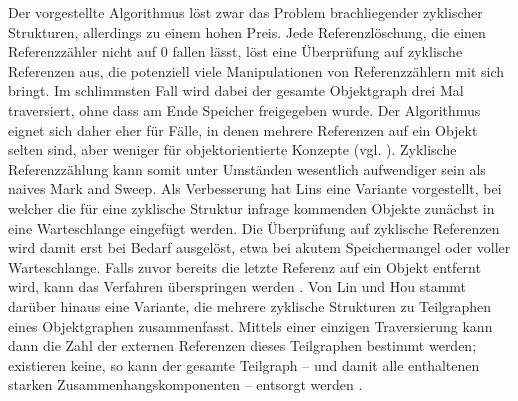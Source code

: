 Der vorgestellte Algorithmus löst zwar das Problem brachliegender zyklischer Strukturen, allerdings zu einem hohen Preis.
Jede Referenzlöschung, die einen Referenzzähler nicht auf $0$ fallen lässt, löst eine Überprüfung auf zyklische Referenzen aus, die potenziell viele Manipulationen von Referenzzählern mit sich bringt.
Im schlimmsten Fall wird dabei der gesamte Objektgraph drei Mal traversiert, ohne dass am Ende Speicher freigegeben wurde.
Der Algorithmus eignet sich daher eher für Fälle, in denen mehrere Referenzen auf ein Objekt selten sind, aber weniger für objektorientierte Konzepte (vgl. \cite[S. 215]{lins1992}).
Zyklische Referenzzählung kann somit unter Umständen wesentlich aufwendiger sein als naives Mark and Sweep.
Als Verbesserung hat Lins eine Variante vorgestellt, bei welcher die für eine zyklische Struktur infrage kommenden Objekte zunächst in eine Warteschlange eingefügt werden.
Die Überprüfung auf zyklische Referenzen wird damit erst bei Bedarf ausgelöst, etwa bei akutem Speichermangel oder voller Warteschlange.
Falls zuvor bereits die letzte Referenz auf ein Objekt entfernt wird, kann das Verfahren überspringen werden \cite{lins1992}.
Von Lin und Hou stammt darüber hinaus eine Variante, die mehrere zyklische Strukturen zu Teilgraphen eines Objektgraphen zusammenfasst.
Mittels einer einzigen Traversierung kann dann die Zahl der externen Referenzen dieses Teilgraphen bestimmt werden; existieren keine, so kann der gesamte Teilgraph -- und damit alle enthaltenen starken Zusammenhangskomponenten -- entsorgt werden \cite{linhou2006}.
